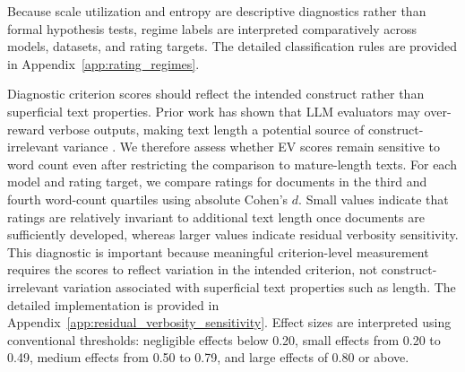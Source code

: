 \begin{description}
    Because scale utilization and entropy are descriptive diagnostics rather than formal hypothesis tests, regime labels are interpreted comparatively across models, datasets, and rating targets. The detailed classification rules are provided in Appendix~\ref{app:rating_regimes}. 


    \item[\textbf{Residual verbosity sensitivity.}]
    Diagnostic criterion scores should reflect the intended construct rather than superficial text properties. Prior work has shown that LLM evaluators may over-reward verbose outputs, making text length a potential source of construct-irrelevant variance \citep{saito_verbosity_2023}. We therefore assess whether EV scores remain sensitive to word count even after restricting the comparison to mature-length texts. For each model and rating target, we compare ratings for documents in the third and fourth word-count quartiles using absolute Cohen's $d$. Small values indicate that ratings are relatively invariant to additional text length once documents are sufficiently developed, whereas larger values indicate residual verbosity sensitivity. This diagnostic is important because meaningful criterion-level measurement requires the scores to reflect variation in the intended criterion, not construct-irrelevant variation associated with superficial text properties such as length. The detailed implementation is provided in Appendix~\ref{app:residual_verbosity_sensitivity}. Effect sizes are interpreted using conventional thresholds: negligible effects below 0.20, small effects from 0.20 to 0.49, medium effects from 0.50 to 0.79, and large effects of 0.80 or above.


\end{description}


